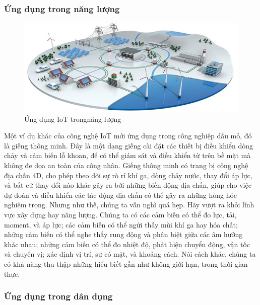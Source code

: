 \subsubsection*{Ứng dụng trong năng lượng }

\begin{figure}[H] 
\centering    
\includegraphics[width=1\textwidth]{pic9}
\caption[Ứng dụng IoT trong năng lượng]{Ứng dụng IoT trongnăng lượng}
\label{fig:pic9}
\end{figure}
Một ví dụ khác của công nghệ IoT mới ứng dụng trong công nghiệp dầu mỏ, đó là giếng thông minh. Đây là một dạng giếng cài đặt các thiết bị điều khiển dòng chảy và cảm biến lỗ khoan, để có thể giám sát và điều khiển từ trên bề mặt mà không đe dọa an toàn của công nhân. Giếng thông minh có trang bị công nghệ địa chấn 4D, cho phép theo dõi sự rò rỉ khí ga, dòng chảy nước, thay đổi áp lực, và bất cứ thay đổi nào khác gây ra bởi những biến động địa chấn, giúp cho việc dự đoán và điều khiển các tác động địa chấn có thể gây ra những hỏng hóc nghiêm trọng.
Nhưng như thế, chúng ta vẫn nghĩ quá hẹp. Hãy vượt ra khỏi lĩnh vực xây dựng hay năng lượng. Chúng ta có các cảm biến có thể đo lực, tải, moment, và áp lực; các cảm biến có thể ngửi thấy mùi khí ga hay hóa chất; những cảm biến có thể nghe thấy rung động và phân biệt giữa các âm hưởng khác nhau; những cảm biến có thể đo nhiệt độ, phát hiện chuyển động, vận tốc và chuyển vị; xác định vị trí, sự có mặt, và khoảng cách. Nói cách khác, chúng ta có khả năng thu thập những hiểu biết gần như không giới hạn, trong thời gian thực.

\subsubsection*{Ứng dụng trong dân dụng  }

